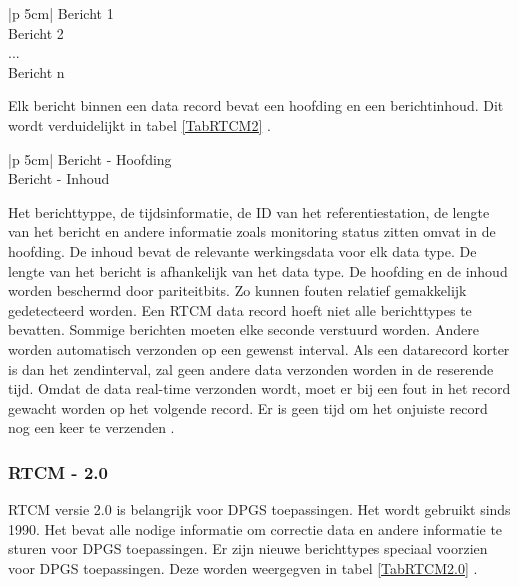 \begin{table}[hbp]
	\caption{RTCM record, verdeeld in verschillende berichttypes}		
	\begin{tabular}{|p {5cm}|}	
		\hline
		Bericht 1 \\ \hline
		Bericht 2 \\ \hline
		... \\ \hline
		Bericht n \\ \hline
	\end{tabular}
	\label{TabRTCMBer}
\end{table}

Elk bericht binnen een data record bevat een hoofding en een berichtinhoud. Dit wordt verduidelijkt in tabel \ref{TabRTCM2} \cite{LBibRTCM3}.

\begin{table}[hbp]
	\caption{RTCM bericht, verdeeld in hoofding en bericht}		
	\begin{tabular}{|p {5cm}|}	
		\hline
		Bericht - Hoofding \\ \hline
		Bericht - Inhoud \\ \hline
	\end{tabular}
	\label{TabRTCM2}
\end{table}

Het berichttyppe, de tijdsinformatie, de ID van het referentiestation, de lengte van het bericht en andere informatie zoals monitoring status zitten omvat in de hoofding. De inhoud bevat de relevante werkingsdata voor elk data type. De lengte van het bericht is afhankelijk van het data type. De hoofding en de inhoud worden beschermd door pariteitbits. Zo kunnen fouten relatief gemakkelijk gedetecteerd worden. Een RTCM data record hoeft niet alle berichttypes te bevatten. Sommige berichten moeten elke seconde verstuurd worden. Andere worden automatisch verzonden op een gewenst interval. Als een datarecord korter is dan het zendinterval, zal geen andere data verzonden worden in de reserende tijd. Omdat de data real-time verzonden wordt, moet er bij een fout in het record gewacht worden op het volgende record. Er is geen tijd om het onjuiste record nog een keer te verzenden \cite{LBibRTCM3}. 

\subsubsection{RTCM - 2.0}
RTCM versie 2.0 is belangrijk voor DPGS toepassingen. Het wordt gebruikt sinds 1990. Het bevat alle nodige informatie om correctie data en andere informatie te sturen voor DPGS toepassingen. Er zijn nieuwe berichttypes speciaal voorzien voor DPGS toepassingen. Deze worden weergegven in tabel \ref{TabRTCM2.0} \cite{LBibRTCM3}.

